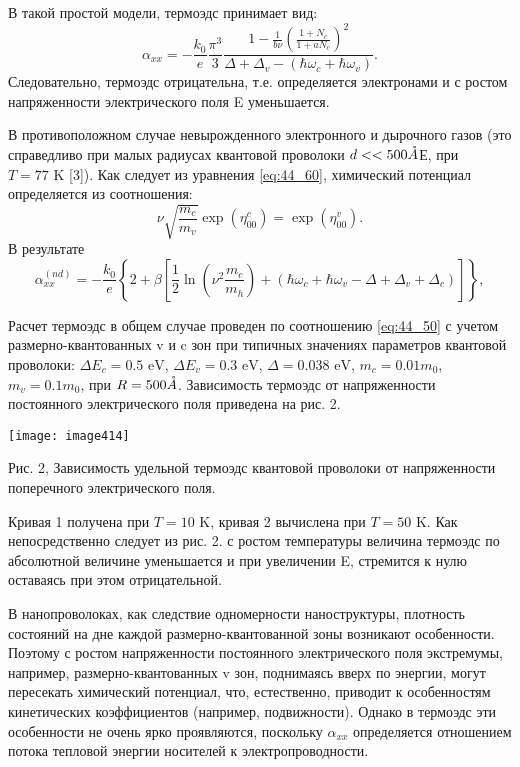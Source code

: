 В такой простой модели, термоэдс принимает вид:
\begin{equation} \label{eq:44_70}
\alpha _{xx} =-\frac{k_{0} }{e} \frac{\pi ^{3} }{3} \frac{1-\frac{1}{b\nu } \left(\frac{1+N_{c} }{1+aN_{c} } \right)^{2} }{\Delta +\Delta _{v} -\left(\hbar \omega _{c} +\hbar \omega _{v} \right)} .
\end{equation} 
Следовательно, термоэдс отрицательна, т.е. определяется электронами и с ростом напряженности электрического поля E уменьшается.

В противоположном случае невырожденного электронного и дырочного газов (это справедливо при малых радиусах квантовой проволоки $d<<500 \AA$Е, при $T=77 \text{ K}$ [3]). Как следует из уравнения \eqref{eq:44_60}, химический потенциал определяется из соотношения:
\begin{equation} \label{eq:44_80}
\nu \sqrt{\frac{m_{c} }{m_{v} } } \exp \left(\eta _{00}^{c} \right)=\exp \left(\eta _{00}^{v} \right).
\end{equation}  
В результате
\begin{equation} \label{eq:44_90}
\alpha _{xx}^{(nd)} =-\frac{k_{0} }{e} \left\{2+\beta \left[\frac{1}{2} \ln (\nu ^{2} \frac{m_{c} }{m_{h} } )+\left(\hbar \omega _{c} +\hbar \omega _{v} -\Delta +\Delta _{v} +\Delta _{c} \right)\right]\right\},
\end{equation} 
 
Расчет термоэдс в общем случае проведен по соотношению \eqref{eq:44_50} с учетом размерно-квантованных v и c зон при типичных значениях параметров квантовой проволоки: $\Delta E_{c} =0.5 \text{ eV}$, $\Delta E_{v} =0.3 \text{ eV}$, $\Delta =0.038 \text{ eV}$, $m_{c} =0.01m_{0} $, $m_{v} =0.1m_{0} $, при $R=500 \AA$. Зависимость термоэдс от напряженности постоянного электрического поля приведена на рис. 2. 
 
\noindent \texttt{[image: image414]}
 
\noindent Рис. 2, Зависимость удельной термоэдс квантовой проволоки от напряженности поперечного электрического поля.
 
Кривая 1 получена при $T=10 \text{ K}$, кривая 2 вычислена при $T=50 \text{ K}$. Как непосредственно следует из рис. 2. с ростом температуры величина термоэдс по абсолютной величине уменьшается и при увеличении E, стремится к нулю оставаясь при этом отрицательной.
 
В нанопроволоках, как следствие одномерности наноструктуры, плотность состояний на дне каждой размерно-квантованной зоны возникают особенности. Поэтому с ростом напряженности постоянного электрического поля экстремумы, например, размерно-квантованных v зон, поднимаясь вверх по энергии, могут пересекать химический потенциал, что, естественно, приводит к особенностям кинетических коэффициентов (например, подвижности). Однако в термоэдс эти особенности не очень ярко проявляются, поскольку $\alpha _{xx} $ определяется отношением потока тепловой энергии носителей к электропроводности.
 
